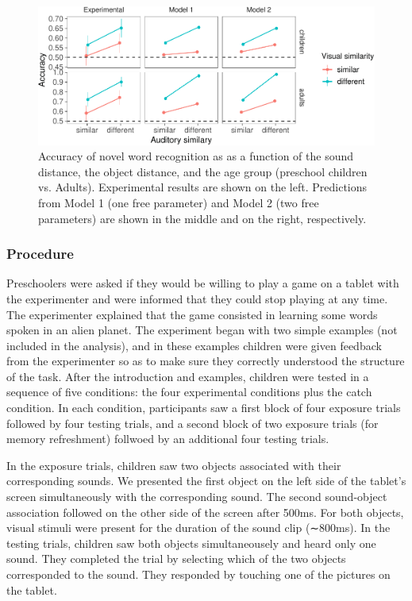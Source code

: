 \documentclass[10pt, letterpaper]{article}
\newenvironment{CodeChunk}{}{}
\begin{document}
\begin{CodeChunk}
\begin{figure}[h]

{\centering \includegraphics{figs/all_data-1} 

}

\caption{\label{fig:data_all}Accuracy of novel word recognition as as a function of the sound distance, the object distance, and the age group (preschool children vs. Adults). Experimental results are shown on the left. Predictions from Model 1 (one free parameter) and Model 2 (two free parameters) are shown in the middle and on the right, respectively.}\label{fig:all_data}
\end{figure}
\end{CodeChunk}

\subsubsection{Procedure}\label{procedure}

Preschoolers were asked if they would be willing to play a game on a
tablet with the experimenter and were informed that they could stop
playing at any time. The experimenter explained that the game consisted
in learning some words spoken in an alien planet. The experiment began
with two simple examples (not included in the analysis), and in these
examples children were given feedback from the experimenter so as to
make sure they correctly understood the structure of the task. After the
introduction and examples, children were tested in a sequence of five
conditions: the four experimental conditions plus the catch condition.
In each condition, participants saw a first block of four exposure
trials followed by four testing trials, and a second block of two
exposure trials (for memory refreshment) follwoed by an additional four
testing trials.

In the exposure trials, children saw two objects associated with their
corresponding sounds. We presented the first object on the left side of
the tablet's screen simultaneously with the corresponding sound. The
second sound-object association followed on the other side of the screen
after 500ms. For both objects, visual stimuli were present for the
duration of the sound clip (∼800ms). In the testing trials, children saw
both objects simultaneousely and heard only one sound. They completed
the trial by selecting which of the two objects corresponded to the
sound. They responded by touching one of the pictures on the tablet.
\end{document}
